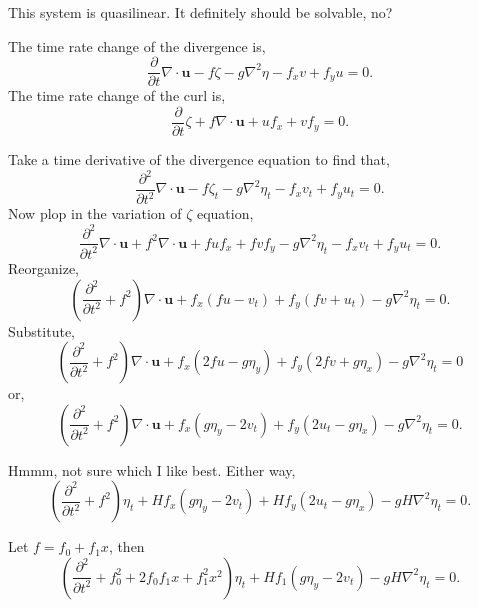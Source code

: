 \documentclass[11pt]{article}
\begin{document}
This system is quasilinear. It definitely should be solvable, no?

The time rate change of the divergence is,
\begin{equation}
\frac{\partial }{\partial t} \nabla \cdot \mathbf{u} - f \zeta - g \nabla^2 \eta -f_x v + f_y u = 0.
\end{equation}
The time rate change of the curl is,
\begin{equation}
\frac{\partial }{\partial t} \zeta + f \nabla \cdot \mathbf{u} + u f_x + v f_y  = 0.
\end{equation}

Take a time derivative of the divergence equation to find that,
\begin{equation}
\frac{\partial^2 }{\partial t^2} \nabla \cdot \mathbf{u} - f \zeta_t - g \nabla^2 \eta_t -f_x v_t + f_y u_t = 0.
\end{equation}
Now plop in the variation of $\zeta$ equation,
\begin{equation}
\frac{\partial^2 }{\partial t^2} \nabla \cdot \mathbf{u} + f^2 \nabla \cdot \mathbf{u} + f u f_x + f v f_y - g \nabla^2 \eta_t -f_x v_t + f_y u_t = 0.
\end{equation}
Reorganize,
\begin{equation}
\left( \frac{\partial^2 }{\partial t^2}   + f^2  \right) \nabla \cdot \mathbf{u} +   f_x (f u - v_t) +  f_y ( f v + u_t) - g \nabla^2 \eta_t = 0.
\end{equation}
Substitute,
\begin{equation}
\left( \frac{\partial^2 }{\partial t^2}   + f^2  \right) \nabla \cdot \mathbf{u} +   f_x (2 f u - g \eta_y ) +  f_y ( 2 f v +g \eta_x ) - g \nabla^2 \eta_t = 0
\end{equation}
or,
\begin{equation}
\left( \frac{\partial^2 }{\partial t^2}   + f^2  \right) \nabla \cdot \mathbf{u} +   f_x ( g \eta_y - 2 v_t ) +  f_y ( 2 u_t - g \eta_x ) - g \nabla^2 \eta_t = 0.
\end{equation}

Hmmm, not sure which I like best. Either way,
\begin{equation}
\left( \frac{\partial^2 }{\partial t^2}   + f^2  \right) \eta_t+   H f_x ( g \eta_y - 2 v_t ) +  H f_y ( 2 u_t - g \eta_x ) - g H \nabla^2 \eta_t = 0.
\end{equation}

Let $f = f_0 + f_1 x$, then
\begin{equation}
\left( \frac{\partial^2 }{\partial t^2}   + f_0^2 + 2f_0 f_1 x + f_1^2 x^2  \right) \eta_t+   H f_1 ( g \eta_y - 2 v_t ) - g H \nabla^2 \eta_t = 0.
\end{equation}
\end{document}
